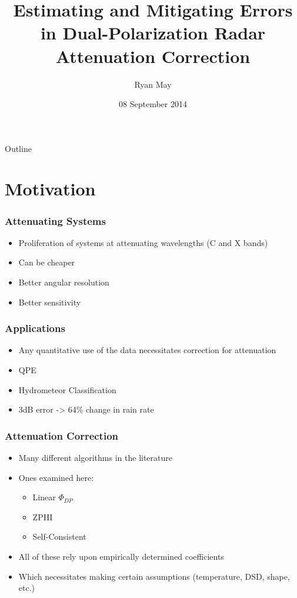 \documentclass[red]{beamer}
\title{Estimating and Mitigating Errors in Dual-Polarization Radar Attenuation Correction}
\author{Ryan May}
\date{08 September 2014}
\begin{document}
\begin{frame}
	\titlepage
\end{frame}

\begin{frame}{Outline}
    \tableofcontents
\end{frame}

\section{Motivation}
\begin{frame}[<+->]
	\frametitle{Attenuating Systems}
	\begin{itemize}
		\item Proliferation of systems at attenuating wavelengths (C and X bands)
		\item Can be cheaper
		\item Better angular resolution
		\item Better sensitivity
	\end{itemize}
\end{frame}

\begin{frame}
	\frametitle{Applications}
	\begin{itemize}[<+->]
		\item Any quantitative use of the data necessitates correction for attenuation
		\item QPE
		\item Hydrometeor Classification
		\item 3dB error -> 64\% change in rain rate
	\end{itemize}
\end{frame}

\begin{frame}
	\frametitle{Attenuation Correction}
	\begin{itemize}[<+->]
		\item Many different algorithms in the literature
		\item Ones examined here:
		\begin{itemize}
			\item Linear $\Phi_{DP}$
			\item ZPHI
			\item Self-Consistent
		\end{itemize}
		\item All of these rely upon empirically determined coefficients
		\item Which necessitates making certain assumptions (temperature,
		DSD, shape, etc.)
	\end{itemize}
\end{frame}
\end{document}
